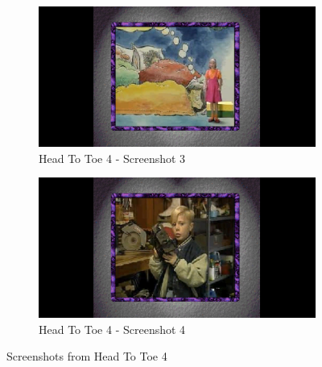 \begin{figure}[H]
    \begin{subfigure}{0.45\textwidth}
        \centering
        \includegraphics[width=\linewidth]{Games/HeadtoToe/Images/HeadToToe4Image3.png}
        \caption{Head To Toe 4 - Screenshot 3}
    \end{subfigure}
    \begin{subfigure}{0.45\textwidth}
        \centering
        \includegraphics[width=\linewidth]{Games/HeadtoToe/Images/HeadToToe4Image4.png}
        \caption{Head To Toe 4 - Screenshot 4}
    \end{subfigure}
    \caption{Screenshots from Head To Toe 4}
\end{figure}